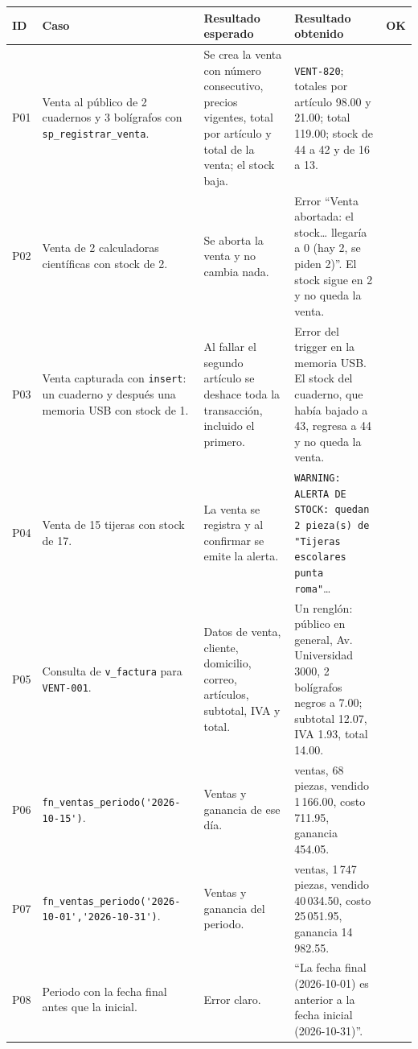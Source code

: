 \documentclass[12pt,a4paper]{article}
\newcommand{\cod}[1]{{\ttfamily\nolinkurl{#1}}}
\newcommand{\codb}[1]{{\ttfamily\nolinkurl{#1}}}
\newcommand{\ok}{\ding{51}}
\begin{document}
\renewcommand{\arraystretch}{1.3}
\footnotesize
\begin{longtable}{@{}>{\centering\arraybackslash}p{0.8cm}
>{\raggedright\arraybackslash}p{4.3cm}
>{\raggedright\arraybackslash}p{4.0cm}
>{\raggedright\arraybackslash}p{\dimexpr\textwidth-9.1cm-0.6cm-8\tabcolsep\relax}
>{\centering\arraybackslash}p{0.6cm}@{}}
\toprule
\textbf{ID} & \textbf{Caso} & \textbf{Resultado esperado} & \textbf{Resultado obtenido} & \textbf{OK} \\
\midrule
\endhead
P01 & Venta al público de 2 cuadernos y 3 bolígrafos con \cod{sp_registrar_venta}. &
Se crea la venta con número consecutivo, precios vigentes, total por artículo y
total de la venta; el stock baja. &
\cod{VENT-820}; totales por artículo 98.00 y 21.00; total 119.00; stock de 44 a 42 y
de 16 a 13. & \ok \\ \midrule
P02 & Venta de 2 calculadoras científicas con stock de 2. &
Se aborta la venta y no cambia nada. &
Error ``Venta abortada: el stock\ldots{} llegaría a 0 (hay 2, se piden 2)''. El stock
sigue en 2 y no queda la venta. & \ok \\ \midrule
P03 & Venta capturada con \cod{insert}: un cuaderno y después una memoria USB con
stock de 1. & Al fallar el segundo artículo se deshace toda la transacción,
incluido el primero. & Error del trigger en la memoria USB. El stock del cuaderno,
que había bajado a 43, regresa a 44 y no queda la venta. & \ok \\ \midrule
P04 & Venta de 15 tijeras con stock de 17. &
La venta se registra y al confirmar se emite la alerta. &
\cod{WARNING: ALERTA DE STOCK: quedan 2 pieza(s) de "Tijeras escolares punta
roma"}\ldots & \ok \\ \midrule
P05 & Consulta de \codb{v_factura} para \cod{VENT-001}. &
Datos de venta, cliente, domicilio, correo, artículos, subtotal, IVA y total. &
Un renglón: público en general, Av. Universidad 3000, 2 bolígrafos negros a 7.00;
subtotal 12.07, IVA 1.93, total 14.00. & \ok \\ \midrule
P06 & \codb{fn_ventas_periodo('2026-10-15')}. & Ventas y ganancia de ese día. &
14 ventas, 68 piezas, vendido 1\,166.00, costo 711.95, ganancia 454.05. & \ok \\ \midrule
P07 & \codb{fn_ventas_periodo('2026-10-01','2026-10-31')}. &
Ventas y ganancia del periodo. &
354 ventas, 1\,747 piezas, vendido 40\,034.50, costo 25\,051.95, ganancia 14\,982.55. & \ok \\ \midrule
P08 & Periodo con la fecha final antes que la inicial. & Error claro. &
``La fecha final (2026-10-01) es anterior a la fecha inicial (2026-10-31)''. & \ok \\ \midrule

\end{longtable}
\end{document}
